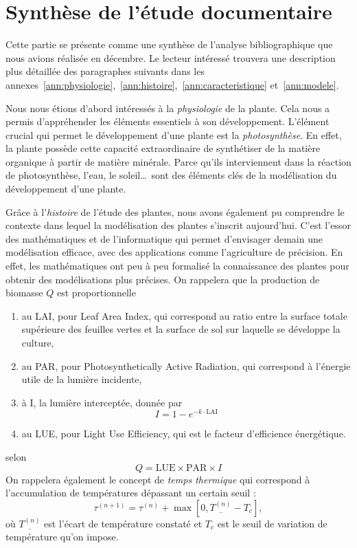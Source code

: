 \section{Synthèse de l'étude documentaire}
Cette partie se présente comme une synthèse de l’analyse bibliographique que nous avions réalisée en décembre.
Le lecteur intéressé trouvera une description plus détaillée des paragraphes suivants
dans les annexes~\ref{ann:physiologie},~\ref{ann:histoire},~\ref{ann:caracteristique}
et~\ref{ann:modele}.

Nous nous étions d’abord intéressés à la \emph{physiologie} de la plante. Cela nous a permis d’appréhender les éléments essentiels à son développement.
L’élément crucial qui permet le développement d’une plante est la \emph{photosynthèse}. En effet, la plante possède cette capacité extraordinaire de synthétiser de la matière organique à partir de matière minérale. 
Parce qu’ils interviennent dans la réaction de photosynthèse, l’eau, le soleil\dots ~sont des éléments clés de la modélisation du développement d’une plante.

Grâce à l’\emph{histoire} de l’étude des plantes, nous avons également pu comprendre le contexte dans lequel la modélisation des plantes s’inscrit aujourd’hui. C’est l’essor des mathématiques et de l’informatique qui permet d’envisager demain une modélisation efficace, avec des applications comme l’agriculture de précision. 
En effet, les mathématiques ont peu à peu formalisé la connaissance des plantes pour obtenir des modélisations plus précises.
On rappelera que la production de biomasse $Q$ est proportionnelle
\begin{enumerate}
  \item au LAI, pour Leaf Area Index, qui correspond au ratio entre la surface totale supérieure des feuilles
  vertes et la surface de sol sur laquelle se développe la culture,
  \item au PAR, pour Photosynthetically Active Radiation, qui correspond à l'énergie utile de la lumière incidente,
  \item à I, la lumière interceptée, donnée par
  \[ I = 1-e^{-k\cdot\mathrm{LAI}} \]
  \item au LUE, pour Light Use Efficiency, qui est le facteur d'efficience énergétique.
\end{enumerate}
selon
\[ 
  Q = \mathrm{LUE}\times\mathrm{PAR}\times I 
\]
On rappelera également le concept de \emph{temps thermique} qui correspond à l'accumulation de températures dépassant un certain seuil :
\[
\tau^{(n+1)} = \tau^{(n)} + \max[0, \underline{T^{(n)}} - T_c], 
\]
où $\underline{T^{(n)}}$ est l'écart de température constaté et 
$T_c$ est le seuil de variation de température qu'on impose.

